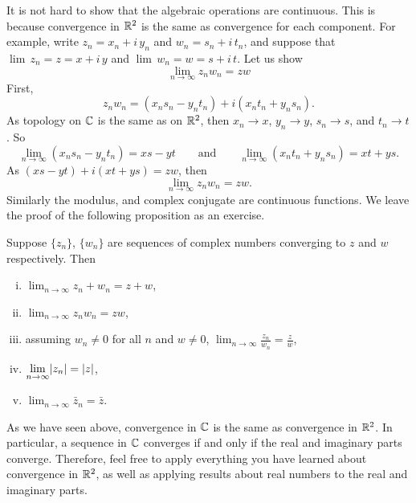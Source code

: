 It is not hard to show that the algebraic operations are
continuous.  This is because convergence in 
${\mathbb{R}}^2$ is the same as convergence for each component.  For example,
write $z_n = x_n + i\,y_n$ and
$w_n = s_n + i\,t_n$, and suppose that
$\lim \, z_n = z = x+i\,y$ and $\lim \, w_n = w = s+i\,t$.
Let us show
\begin{equation*}
\lim_{n\to\infty} z_n w_n = zw
\end{equation*}
First,
\begin{equation*}
z_n w_n = (x_ns_n-y_nt_n) + i(x_nt_n+y_ns_n) .
\end{equation*}
As topology on ${\mathbb{C}}$ is the same as on ${\mathbb{R}}^2$, then
$x_n \to x$, $y_n \to y$, $s_n \to s$, and $t_n \to t$.
So
\begin{equation*}
\lim_{n\to\infty} (x_ns_n-y_nt_n) = xs-yt \qquad \text{and} \qquad
\lim_{n\to\infty} (x_nt_n+y_ns_n) = xt+ys .
\end{equation*}
As
$(xs-yt)+i(xt+ys) = zw$, then
\begin{equation*}
\lim_{n\to\infty} z_n w_n = zw .
\end{equation*}
Similarly the modulus, and complex conjugate are continuous functions.  We
leave the proof of the following proposition as an exercise.

\begin{prop} \label{prop:continuityofcomplex}
Suppose $\{ z_n \}$, $\{ w_n \}$ are sequences of complex numbers converging
to $z$ and $w$ respectively.  Then
\begin{enumerate}[(i)]
\item
$\displaystyle \lim_{n\to \infty} z_n + w_n = z + w$,
\item
$\displaystyle \lim_{n\to \infty} z_n w_n = z w$,
\item
assuming $w_n \not= 0$ for all $n$ and $w\not= 0$,
$\displaystyle \lim_{n\to \infty} \frac{z_n}{w_n} = \frac{z}{w}$,
\item
$\displaystyle \lim_{n\to \infty} \lvert {z_n} \rvert = \lvert {z} \rvert$,
\item
$\displaystyle \lim_{n\to \infty} \bar{z}_n = \bar{z}$.
\end{enumerate}
\end{prop}

As we have seen above, convergence in ${\mathbb{C}}$ is the same as convergence in
${\mathbb{R}}^2$.  In particular, a sequence in ${\mathbb{C}}$ converges if and only if
the real and imaginary parts converge.  Therefore, feel free to apply
everything you have learned about convergence in ${\mathbb{R}}^2$, as well as
applying results about real numbers to the real and imaginary parts.

